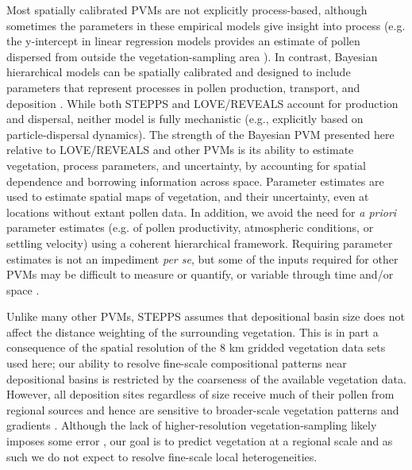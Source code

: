 \documentclass[12pt]{article}
\begin{document}
Most spatially calibrated PVMs are not explicitly process-based,
although sometimes the parameters in these empirical models give
insight into process (e.g. the y-intercept in linear regression models
provides an estimate of pollen dispersed from outside the
vegetation-sampling area \citep{webb1981estimating}).  In contrast,
Bayesian hierarchical models can be spatially calibrated and designed
to include parameters that represent processes in pollen production,
transport, and deposition \citep{paciorek2009mapping}. While both
STEPPS and LOVE/REVEALS account for production and dispersal, neither
model is fully mechanistic (e.g., explicitly based on
particle-dispersal dynamics). The strength of the Bayesian PVM
presented here relative to LOVE/REVEALS and other PVMs is its ability
to estimate vegetation, process parameters, and uncertainty, by
accounting for spatial dependence and borrowing information across
space. Parameter estimates are used to estimate spatial maps of
vegetation, and their uncertainty, even at locations without extant
pollen data. In addition, we avoid the need for \textit{a priori}
parameter estimates (e.g. of pollen productivity, atmospheric
conditions, or settling velocity) using a coherent hierarchical
framework. Requiring parameter estimates is not an impediment
\textit{per se}, but some of the inputs required for other PVMs may be
difficult to measure or quantify, or variable through time and/or
space \citep{jackson1994pollen, jackson1999pollen}.

Unlike many other PVMs, STEPPS assumes that depositional basin size
does not affect the distance weighting of the surrounding
vegetation. This is in part a consequence of the spatial resolution of
the 8 km gridded vegetation data sets used here; our ability to
resolve fine-scale compositional patterns near depositional basins is
restricted by the coarseness of the available vegetation
data. However, all deposition sites regardless of size receive much of
their pollen from regional sources and hence are sensitive to
broader-scale vegetation patterns and gradients
\citep{bradshaw1985relationships, prentice1987quantitative,
  jackson1991pollen, sugita2007theory1, sugita2007theory2}. Although
the lack of higher-resolution vegetation-sampling likely imposes some
error \citep{bradshaw1985relationships, prentice1987quantitative,
  jackson1990}, our goal is to predict vegetation at a regional scale
and as such we do not expect to resolve fine-scale local
heterogeneities.


\end{document}
